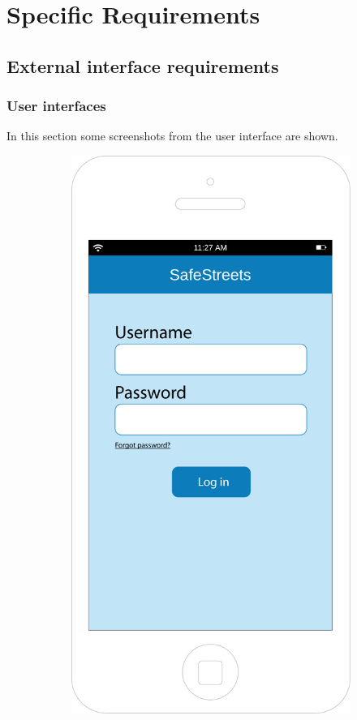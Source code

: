 \documentclass[12pt,a4paper]{report}
\begin{document}

\chapter{Specific Requirements}
	\section{External interface requirements}
		\subsection{User interfaces}
		In this section some screenshots from the user interface are shown.
		\begin{figure}[H]
		\begin{subfigure}{0.5\textwidth}
			\includegraphics[scale=0.25, center]{Login}

\end{subfigure}
\end{figure}
\end{document}
